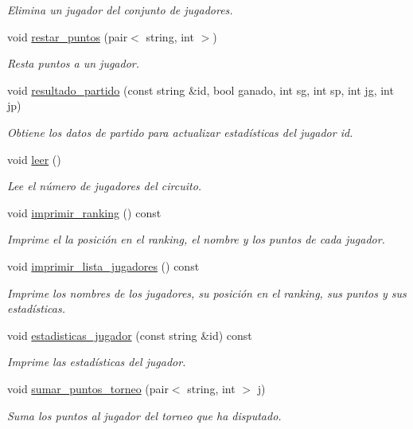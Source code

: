 \begin{DoxyCompactItemize}
\begin{DoxyCompactList}\small\item\em Elimina un jugador del conjunto de jugadores. \end{DoxyCompactList}\item 
void \hyperlink{class_cjt__jugadores_a1940533810f2ea0b82c9a409b9ce6fab}{restar\+\_\+puntos} (pair$<$ string, int $>$)
\begin{DoxyCompactList}\small\item\em Resta puntos a un jugador. \end{DoxyCompactList}\item 
void \hyperlink{class_cjt__jugadores_a843a0aa4f91b785797a5023c23766bf9}{resultado\+\_\+partido} (const string \&id, bool ganado, int sg, int sp, int jg, int jp)
\begin{DoxyCompactList}\small\item\em Obtiene los datos de partido para actualizar estadísticas del jugador id. \end{DoxyCompactList}\item 
void \hyperlink{class_cjt__jugadores_a625e1ba48fc2f9b7c868820e1dc417f1}{leer} ()
\begin{DoxyCompactList}\small\item\em Lee el número de jugadores del circuito. \end{DoxyCompactList}\item 
void \hyperlink{class_cjt__jugadores_a2eca08ea3674049547e6eb6242da1df5}{imprimir\+\_\+ranking} () const
\begin{DoxyCompactList}\small\item\em Imprime el la posición en el ranking, el nombre y los puntos de cada jugador. \end{DoxyCompactList}\item 
void \hyperlink{class_cjt__jugadores_aeeb65f2beec6cac01abf0135b37dd104}{imprimir\+\_\+lista\+\_\+jugadores} () const
\begin{DoxyCompactList}\small\item\em Imprime los nombres de los jugadores, su posición en el ranking, sus puntos y sus estadísticas. \end{DoxyCompactList}\item 
void \hyperlink{class_cjt__jugadores_a4c2e7064b8c6f2647dfb086c6d161bfd}{estadisticas\+\_\+jugador} (const string \&id) const
\begin{DoxyCompactList}\small\item\em Imprime las estadísticas del jugador. \end{DoxyCompactList}\item 
void \hyperlink{class_cjt__jugadores_adaead4375a0c4e8cb02782988423e1d8}{sumar\+\_\+puntos\+\_\+torneo} (pair$<$ string, int $>$ j)
\begin{DoxyCompactList}\small\item\em Suma los puntos al jugador del torneo que ha disputado. \end{DoxyCompactList}\end{DoxyCompactItemize}
